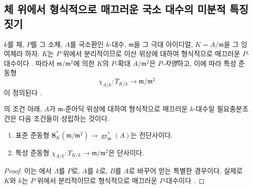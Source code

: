 \subsection{체 위에서 형식적으로 매끄러운 국소 대수의 미분적 특징짓기}
\label{subsection:0.22.2-ko}
\label{0.22.2-ko}

\begin{env}[22.2.1]
\label{0.22.2.1-ko}
$k$를 체, $P$를 그 소체, $A$를 국소환인 $k$-대수, $\mathfrak m$을
그 극대 아이디얼, $K=A/\mathfrak m$을 그 잉여체라 하자. $K$는 $P$ 위에서
분리적이므로 이산 위상에 대하여 형식적으로 매끄러운 $P$-대수이다
. 따라서 $\mathfrak m/\mathfrak m^2$에 의한 $K$의
$P$-확대 $A/\mathfrak m^2$은 $P$-\emph{자명}하고, 이에 따라 특성
준동형
\begin{equation}
\tag{22.2.1.1}
\label{0.22.2.1.1-ko}
  \chi_{A/k}:\Upsilon_{K/k}\longrightarrow\mathfrak m/\mathfrak m^2
\end{equation}
이 정의된다 .
\end{env}

\begin{theorem}[22.2.2]
\label{0.22.2.2-ko}
의 조건 아래, $A$가 $\mathfrak m$-준아딕 위상에
대하여 형식적으로 매끄러운 $k$-대수일 필요충분조건은 다음 조건들이
성립하는 것이다.
\begin{enumerate}
  \item[\rm(i)] 표준 준동형
  $\mathbf S_K^*(\mathfrak m/\mathfrak m^2)\to
  \operatorname{gr}_{\mathfrak m}^*(A)$는 전단사이다.
  \item[\rm(ii)] 특성 준동형
  $\chi_{A/k}:\Upsilon_{K/k}\to\mathfrak m/\mathfrak m^2$은 단사이다.
\end{enumerate}
\end{theorem}

\begin{proof}
이는 에서 $\Lambda$를 $P$로, $A$를 $k$로, $B$를
$A$로 바꾸어 얻는 특별한 경우이다. 실제로 $K$와 $k$는 $P$ 위에서
분리적이므로 형식적으로 매끄러운 $P$-대수이다 .
\end{proof}

